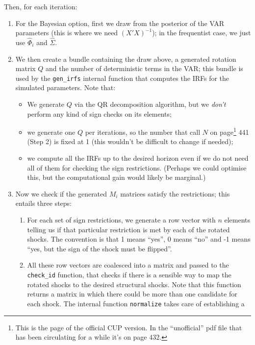 \documentclass[a4paper,10pt]{article}
\begin{document}
Then, for each
iteration:
\begin{enumerate}
\item For the Bayesian option, first we draw from the posterior of the
  VAR parameters (this is where we need $(X'X)^{-1}$); in the
  frequentist case, we just use $\hat{\Phi}_i$ and $\hat{\Sigma}$.
\item We then create a bundle containing the draw above, a generated
  rotation matrix $Q$ and the number of deterministic terms in the
  VAR; this bundle is used by the \verb|gen_irfs| internal function
  that computes the IRFs for the simulated parameters. Note that:
  \begin{itemize}
    \item We generate $Q$ via the QR decomposition algorithm, but we
      \emph{don't} perform any kind of sign checks on its elements;
    \item we generate one $Q$ per iterations, so the number that
      \citet{KilianLuetkepohl2017book} call $N$ on page\footnote{This is the page
        of the official CUP version. In the ``unofficial'' pdf file
        that has been circulating for a while it's on page 432.} 441
      (Step 2) is fixed at 1 (this wouldn't be difficult to change if
      needed);
    \item we compute all the IRFs up to the desired horizon even if we
      do not need all of them for checking the sign restrictions. 
      (Perhaps we could optimise this, but the computational
      gain would likely be marginal.)
    \end{itemize}
  \item Now we check if the generated $M_i$ matrices satisfy the
    restrictions; this entails three steps:
    \begin{enumerate}
    \item For each set of sign restrictions, we generate a row vector
      with $n$ elements telling us if that particular restriction
      is met by each of the rotated shocks. The convention is that 1
      means ``yes'', 0 means ``no'' and -1 means ``yes, but the sign
      of the shock must be flipped''.
    \item All these row vectors are coalesced into a matrix and passed
      to the \verb|check_id| function, that checks if there is a
      sensible way to map the rotated shocks to the desired structural
      shocks. Note that this function returns a matrix in which there
      could be more than one candidate for each shock. The internal
      function \texttt{normalize} takes care of establishing a

\end{enumerate}
\end{enumerate}
\end{document}
